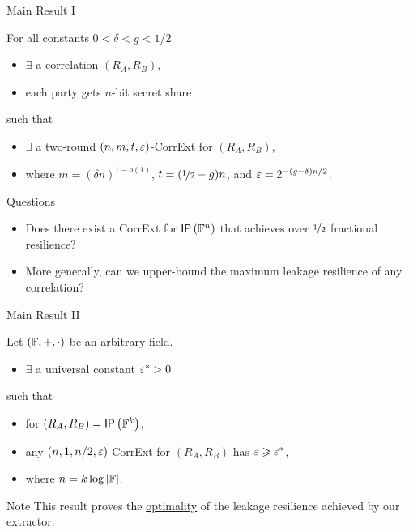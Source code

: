 \begin{frame}{Main Result I}
	\begin{theorem}
	\label{thm:construction}
	For all constants $0<\delta<g<1/2$
	\begin{itemize}
		\item $ \exists $ a correlation $(R_A,R_B)$, 
		\item each party gets $n$-bit secret share
	\end{itemize}
	such that 
	\begin{itemize}
		\item $ \exists $ a two-round $(n,m,t,\varepsilon)$-CorrExt for $(R_A,R_B)$,
		\item where $m=(\delta n)^{1-o(1)}$, \pause $t=(\nicefrac12-g)n$, \pause and $\varepsilon=2^{-(g-\delta)n/2}$.
	\end{itemize} 
	\end{theorem}
	\pause
	{
	\begin{block}{Questions}
		\begin{itemize}
		\item Does there exist a CorrExt for $ \IP[\bbF^n] $ that achieves over $ \nicefrac{1}{2} $ fractional resilience? \pause
		\item More generally, can we upper-bound the maximum leakage resilience of any correlation? 
		\end{itemize}
	\end{block}
	}
\end{frame}

\begin{frame}{Main Result II}
	\begin{theorem}
	\label{thm:hardness} 
	Let $({\mathbb F},+,\cdot)$ be an arbitrary field.
	\begin{itemize}
		\item $ \exists $ a universal constant $\varepsilon^*>0$
	\end{itemize}
	such that
	\begin{itemize}
		\item  for $(R_A,R_B)=\IP [\bbF^k] $, %
		\item any $(n,1,%
		n/2,\eps)$-CorrExt for $(R_A,R_B)$ has $\varepsilon\geqslant\varepsilon^*$,
		\item  where $n=k\log\left\vert{\ensuremath{{\mathbb F}}}\right\vert$.  
	\end{itemize}
\end{theorem}

{
\begin{block}{Note}
	This result proves the \underline{optimality} of the leakage resilience achieved by our extractor.
\end{block}}

\end{frame}